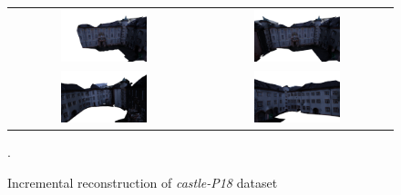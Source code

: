 \begin{figure}[t]
\centering
\begin{tabular}{cc}
\includegraphics[width=0.47\textwidth]{./img/ch-incr-dens/castle01}&
\includegraphics[width=0.47\textwidth]{./img/ch-incr-dens/castle02}\\
\includegraphics[width=0.47\textwidth]{./img/ch-incr-dens/castle03}&
\includegraphics[width=0.47\textwidth]{./img/ch-incr-dens/castle04}
\end{tabular}
\caption{Incremental reconstruction of \emph{castle-P18} dataset}.
\label{fig:castle}
\end{figure}

